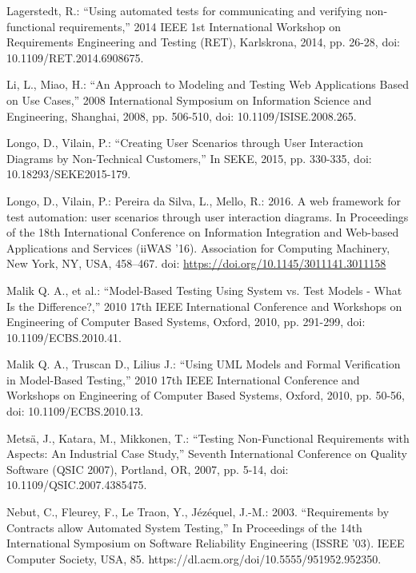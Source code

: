 \documentclass[a4paper,10pt, bibliography=totocnumbered]{scrreprt}
\begin{document}
\begin{thebibliography}{9}
 Lagerstedt, R.: \enquote{Using automated tests for communicating and verifying non-functional requirements,} 2014 IEEE 1st International Workshop on Requirements Engineering and Testing (RET), Karlskrona, 2014, pp. 26-28, doi: 10.1109/RET.2014.6908675.

 Li, L., Miao, H.: \enquote{An Approach to Modeling and Testing Web Applications Based on Use Cases,} 2008 International Symposium on Information Science and Engineering, Shanghai, 2008, pp. 506-510, doi: 10.1109/ISISE.2008.265.

 Longo, D., Vilain, P.: \enquote{Creating User Scenarios through User Interaction Diagrams by Non-Technical Customers,} In SEKE, 2015, pp. 330-335, doi: 10.18293/SEKE2015-179.

 Longo, D., Vilain, P.: Pereira da Silva, L., Mello, R.: 2016. A web framework for test automation: user scenarios through user interaction diagrams. In Proceedings of the 18th International Conference on Information Integration and Web-based Applications and Services (iiWAS '16). Association for Computing Machinery, New York, NY, USA, 458–467. doi: \url{https://doi.org/10.1145/3011141.3011158}

 Malik Q. A., et al.: \enquote{Model-Based Testing Using System vs. Test Models - What Is the Difference?,} 2010 17th IEEE International Conference and Workshops on Engineering of Computer Based Systems, Oxford, 2010, pp. 291-299, doi: 10.1109/ECBS.2010.41.

 Malik Q. A., Truscan D., Lilius J.: \enquote{Using UML Models and Formal Verification in Model-Based Testing,} 2010 17th IEEE International Conference and Workshops on Engineering of Computer Based Systems, Oxford, 2010, pp. 50-56, doi: 10.1109/ECBS.2010.13.

 Metsä, J., Katara, M., Mikkonen, T.: \enquote{Testing Non-Functional Requirements with Aspects: An Industrial Case Study,} Seventh International Conference on Quality Software (QSIC 2007), Portland, OR, 2007, pp. 5-14, doi: 10.1109/QSIC.2007.4385475.

 Nebut, C., Fleurey, F., Le Traon, Y., Jézéquel, J.-M.: 2003. \enquote{Requirements by Contracts allow Automated System Testing,} In Proceedings of the 14th International Symposium on Software Reliability Engineering (ISSRE '03). IEEE Computer Society, USA, 85.
https://dl.acm.org/doi/10.5555/951952.952350.


\end{thebibliography}
\end{document}
